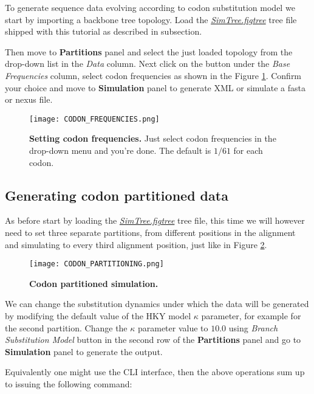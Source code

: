 To generate sequence data evolving according to codon substitution model we start by importing a backbone tree topology. 
Load the \href{http://rega.kuleuven.be/cev/ecv/software/buss_files/simtree.figtree}{\emph{SimTree.figtree}} tree file shipped with this tutorial as described in \emph{\loading} subsection.   

Then move to \textbf{Partitions} panel and select the just loaded topology from the drop-down list in the \emph{Data} column. 
Next click on the button under the \emph{Base Frequencies} column, select codon frequencies as shown in the Figure \ref{fig:CodonFrequencies}.
Confirm your choice and move to \textbf{Simulation} panel to generate XML or simulate a fasta or nexus file.

\begin{figure}[h!]
\centering
\texttt{[image: CODON\_FREQUENCIES.png]} 
\caption{
{ \footnotesize 
{\bf Setting codon frequencies.}
Just select codon frequencies in the drop-down menu and you're done. The default is $1/61$ for each codon.
} %
}
\label{fig:CodonFrequencies}
\end{figure}

\subsection{Generating codon partitioned data}
As before start by loading the \href{http://rega.kuleuven.be/cev/ecv/software/buss_files/simtree.figtree}{\emph{SimTree.figtree}} tree file, this time we will however need to set three separate partitions, from different positions in the alignment and simulating to every third alignment position, just like in Figure \ref{fig:CodonPartitoning}.

\begin{figure}[h!]
\centering
\texttt{[image: CODON\_PARTITIONING.png]} 
\caption{
{ \footnotesize 
{\bf Codon partitioned simulation.}
} %
}
\label{fig:CodonPartitoning}
\end{figure}

We can change the substitution dynamics under which the data will be generated by modifying the default value of the HKY model $\kappa$ parameter, for example for the second partition.
Change the $\kappa$ parameter value to $10.0$ using \emph{Branch Substitution Model} button in the second row of the \textbf{Partitions} panel and go to \textbf{Simulation} panel to generate the output.

Equivalently one might use the CLI interface, then the above operations sum up to issuing the following command:

